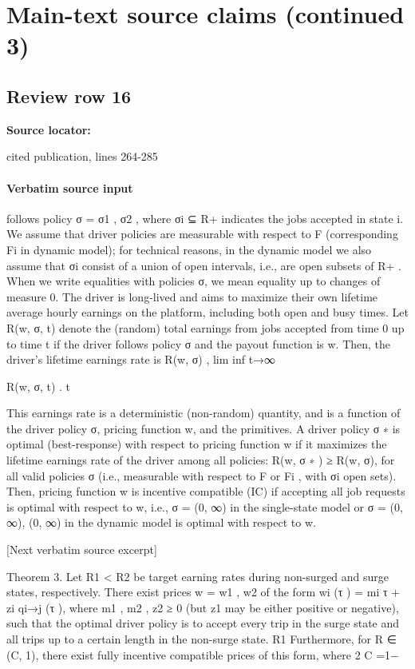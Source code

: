 \documentclass[10pt]{article}
\begin{document}
\section*{Main-text source claims (continued 3)}
\subsection*{Review row 16}
\textbf{Source locator:} {\footnotesize\raggedright cited publication, lines 264-\allowbreak{}285\par}
\paragraph{Verbatim source input}
\begin{ReviewVerbatim}
follows policy σ = {σ1 , σ2 }, where σi ⊆ R+ indicates the jobs accepted in state i. We assume that
driver policies are measurable with respect to F (corresponding Fi in dynamic model); for technical
reasons, in the dynamic model we also assume that σi consist of a union of open intervals, i.e., are
open subsets of R+ . When we write equalities with policies σ, we mean equality up to changes of
measure 0.
The driver is long-lived and aims to maximize their own lifetime average hourly earnings on the
platform, including both open and busy times. Let R(w, σ, t) denote the (random) total earnings
from jobs accepted from time 0 up to time t if the driver follows policy σ and the payout function
is w. Then, the driver’s lifetime earnings rate is
R(w, σ) , lim inf t→∞

R(w, σ, t)
.
t

This earnings rate is a deterministic (non-random) quantity, and is a function of the driver policy
σ, pricing function w, and the primitives.
A driver policy σ ∗ is optimal (best-response) with respect to pricing function w if it maximizes
the lifetime earnings rate of the driver among all policies: R(w, σ ∗ ) ≥ R(w, σ), for all valid policies
σ (i.e., measurable with respect to F or Fi , with σi open sets). Then, pricing function w is incentive
compatible (IC) if accepting all job requests is optimal with respect to w, i.e., σ = (0, ∞) in
the single-state model or σ = {(0, ∞), (0, ∞)} in the dynamic model is optimal with respect to w.

[Next verbatim source excerpt]

Theorem 3. Let R1 < R2 be target earning rates during non-surged and surge states, respectively.
There exist prices w = {w1 , w2 } of the form
wi (τ ) = mi τ + zi qi→j (τ ),
where m1 , m2 , z2 ≥ 0 (but z1 may be either positive or negative), such that the optimal driver policy
is to accept every trip in the surge state and all trips up to a certain length in the non-surge state.
R1
Furthermore, for R
∈ (C, 1), there exist fully incentive compatible prices of this form, where
2
C =1−


\end{ReviewVerbatim}
\end{document}
